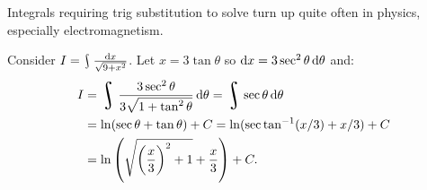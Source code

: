 Integrals requiring trig substitution to solve turn up quite often in physics, especially electromagnetism.


\begin{ex}
  Consider $ I = \rint \frac{\dif{x}}{\sqrt{9 + x^2}} $. Let $ x = 3\tan\theta $ so $ \dif{x} = 3\sec^2\theta \dif{\theta} $ and:
  \begin{align*}
    I &= \rint \frac{3\sec^2 \theta}{3\sqrt{1 + \tan^2 \theta}} \dif{\theta} = \rint \sec \theta \dif{\theta}\\
      &= \ln(\sec \theta + \tan \theta) + C = \ln(\sec \tan^{-1} (x/3) + x/3) + C\\
      &= \ln\left( \sqrt{\left(\frac{x}{3}\right)^2 + 1} + \frac{x}{3} \right) + C.
  \end{align*}
\end{ex}

\clearpage
